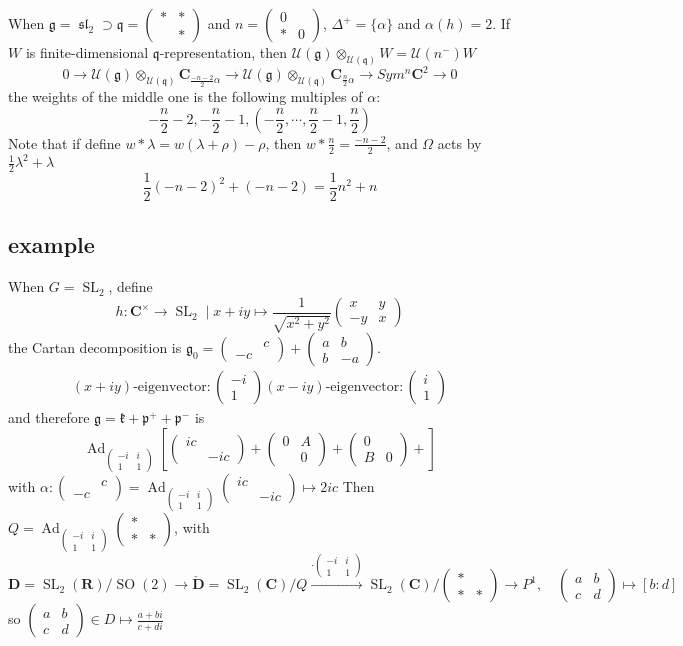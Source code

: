 \documentclass[leqno]{amsart}
\newcommand{\smat}[1]{\left( \begin{smallmatrix} #1 \end{smallmatrix} \right)}
\DeclareMathOperator{\SL}{SL}
\DeclareMathOperator{\SO}{SO}
\DeclareMathOperator{\sll}{\mathfrak{sl}}
\DeclareMathOperator{\Ad}{Ad}
\newcommand{\C}{\mathbf C}
\newcommand{\R}{\mathbf R}
\newcommand{\DD}{\mathbf{D}}
\newcommand{\DDD}{\check{\mathbf{D}}}
\newcommand{\1}{\mathbf{1}}
\newcommand{\rfg}{\mathfrak{g}_0}
\newcommand{\cfg}{\mathfrak{g}}
\newcommand{\cfk}{\mathfrak{k}}
\newcommand{\cfp}{\mathfrak{p}}
\newcommand{\cfq}{\mathfrak{q}}
\theoremstyle{definition}
\theoremstyle{remark}
\begin{document}
When $\cfg=\sll_2\supset \cfq=\smat{*&*\\&*}$ 
and $n=\smat{0&\\*&0}$,
$\Delta^+=\{\alpha\}$ and $\alpha(h)=2$.
If  $W$ is finite-dimensional  $\cfq$-representation,
then  $\mathcal{U}(\cfg)\otimes_{\mathcal{U}(\cfq)}W=\mathcal{U}(n^-)W$
\[
	0\to
	\mathcal{U}(\cfg)
	\otimes_{ \mathcal{U}(\cfq)}
	\C_{\frac{-n-2}{2}\alpha}\to
	\mathcal{U}(\cfg)
	\otimes_{ \mathcal{U}(\cfq)}
	\C_{\frac{n}{2}\alpha}\to
	Sym^n\C^2\to0
\]
the weights of the middle one is
the following multiples of $\alpha$:
 \[
	-\frac{n}{2}-2,
	-\frac{n}{2}-1,
	(-\frac{n}{2},\cdots,
	\frac{n}{2}-1,
	\frac{n}{2})
\]
Note that 
if define 
$w*\lambda=w(\lambda+\rho)-\rho$,
then  $w*\frac{n}{2}=\frac{-n-2}{2}$,
and $\Omega$ acts by
 $\frac{1}{2}\lambda^2+\lambda$
 \[
	 \frac{1}{2}(-n-2)^2+(-n-2)=
	 \frac{1}{2}n^2+n
 \]

\subsection{example}

When $G=\SL_2$, define
 \[
	h\colon \C^\times\to \SL_2\mid
	x+iy\mapsto
	\frac{1}{\sqrt{x^2+y^2}}
	\smat{x&y\\-y&x}
\]
the Cartan decomposition is 
$\rfg=\smat{&c\\-c&}+\smat{a&b\\b&-a}$.
\begin{gather*}
	(x+iy)\text{-eigenvector}\colon
	\smat{-i\\1}
	(x-iy)\text{-eigenvector}\colon
	\smat{i\\1}
\end{gather*}
and therefore $\cfg=\cfk+\cfp^++\cfp^-$ is
\[
	\Ad_{\smat{-i&i\\1&1}}
	\left[
	\smat{ic&\\&-ic}+
	\smat{0&A\\&0}+
	\smat{0&\\B&0}+
	\right]
\]
with $\alpha\colon \smat{&c\\-c&}=
	\Ad_{\smat{-i&i\\1&1}}\smat{ic&\\&-ic}
	\mapsto 2ic $ 
	Then  $Q=\Ad_{\smat{-i&i\\1&1}}\smat{*&\\*&*}$, with
\[
	\DD=
	\SL_2(\R)/\SO(2)\to
	\DDD=\SL_2(\C)/Q
	\xrightarrow{\cdot\smat{-i&i\\1&1}}
	\SL_2(\C)/\smat{*&\\*&*}\to
	P^1,\quad
	\smat{a&b\\c&d}\mapsto [b:d]
\]
	so $\smat{a&b\\c&d}\in D\mapsto 
	\frac{a+bi}{c+di}$
\end{document}
